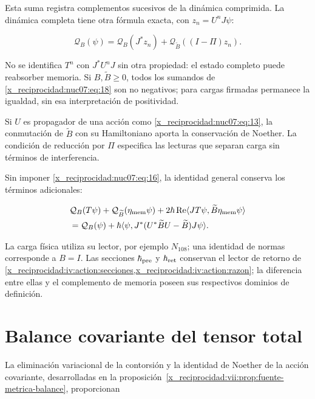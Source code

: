 Esta suma registra complementos sucesivos de la dinámica comprimida. La dinámica completa tiene otra fórmula exacta, con \(z_n=U^nJ\psi\):

\begin{equation}
\mathcal Q_B(\psi)=
\mathcal Q_B(J^*z_n)+
\mathcal Q_{\widetilde B}((I-\Pi)z_n).
\label{x_reciprocidad:nuc07:eq:19}
\end{equation}

No se identifica \(T^n\) con \(J^*U^nJ\) sin otra propiedad: el estado completo puede reabsorber memoria. Si \(B,\widetilde B\ge0\), todos los sumandos de \eqref{x_reciprocidad:nuc07:eq:18} son no negativos; para cargas firmadas permanece la igualdad, sin esa interpretación de positividad.

Si \(U\) es propagador de una acción como \eqref{x_reciprocidad:nuc07:eq:13}, la conmutación de \(\widetilde B\) con su Hamiltoniano aporta la conservación de Noether. La condición de reducción por \(\Pi\) especifica las lecturas que separan carga sin términos de interferencia.

Sin imponer \eqref{x_reciprocidad:nuc07:eq:16}, la identidad general conserva los términos adicionales:

\begin{equation}
\begin{aligned}
&\mathcal Q_B(T\psi)+\mathcal Q_{\widetilde B}(\eta_{\rm mem}\psi)
+2\hbar\operatorname{Re}
\langle JT\psi,\widetilde B\eta_{\rm mem}\psi\rangle\\
&=\mathcal Q_B(\psi)+
\hbar\langle\psi,J^*(U^*\widetilde BU-\widetilde B)J\psi\rangle.
\end{aligned}
\label{x_reciprocidad:nuc07:eq:20}
\end{equation}

La carga física utiliza su lector, por ejemplo \(N_{108}\); una identidad de normas corresponde a \(B=I\). Las secciones \(\hbar_{\rm pre}\) y \(\hbar_{\rm ret}\) conservan el lector de retorno de \cref{x_reciprocidad:iv:action:secciones,x_reciprocidad:iv:action:razon}; la diferencia entre ellas y el complemento de memoria poseen sus respectivos dominios de definición.

\section{Balance covariante del tensor total}

La eliminación variacional de la contorsión y la identidad de Noether de la acción covariante, desarrolladas en la proposición~\ref{x_reciprocidad:vii:prop:fuente-metrica-balance}, proporcionan

